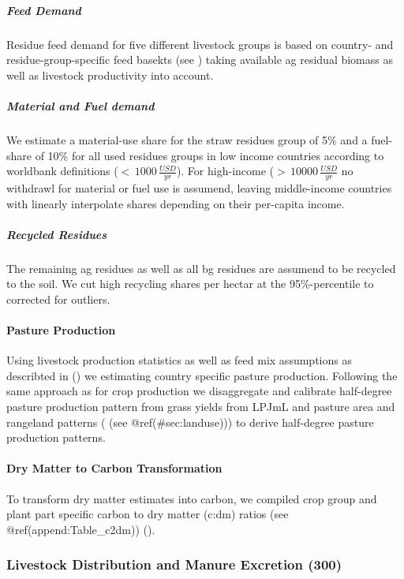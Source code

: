 \documentclass[gc, manuscript]{copernicus}
\begin{document}
\subparagraph{Feed Demand}

Residue feed demand for five different livestock groups is based on
country- and residue-group-specific feed basekts (see \citep{weindl})
taking available ag residual biomass as well as livestock productivity
into account.

\subparagraph{Material and Fuel demand}

We estimate a material-use share for the straw residues group of 5\% and
a fuel-share of 10\% for all used residues groups in low income
countries according to worldbank definitions
(\(<\,1000\,\tfrac{USD}{yr}\)). For high-income
(\(>\,10000\,\tfrac{USD}{yr}\) no withdrawl for material or fuel use is
assumend, leaving middle-income countries with linearly interpolate
shares depending on their per-capita income.

\subparagraph{Recycled Residues}

The remaining ag residues as well as all bg residues are assumend to be
recycled to the soil. We cut high recycling shares per hectar at the
95\%-percentile to corrected for outliers.

\paragraph{Pasture Production}

Using livestock production statistics as well as feed mix assumptions as
describted in (\citep{weindl}) we estimating country specific pasture
production. Following the same approach as for crop production we
disaggregate and calibrate half-degree pasture production pattern from
grass yields from LPJmL and pasture area and rangeland patterns ( (see
@ref(\#sec:landuse))) to derive half-degree pasture production patterns.

\paragraph{Dry Matter to Carbon Transformation}

To transform dry matter estimates into carbon, we compiled crop group
and plant part specific carbon to dry matter (c:dm) ratios (see
@ref(append:Table\_c2dm)) (\citet{Ma2018}).

\subsubsection{Livestock Distribution and Manure Excretion (300)}
\end{document}
